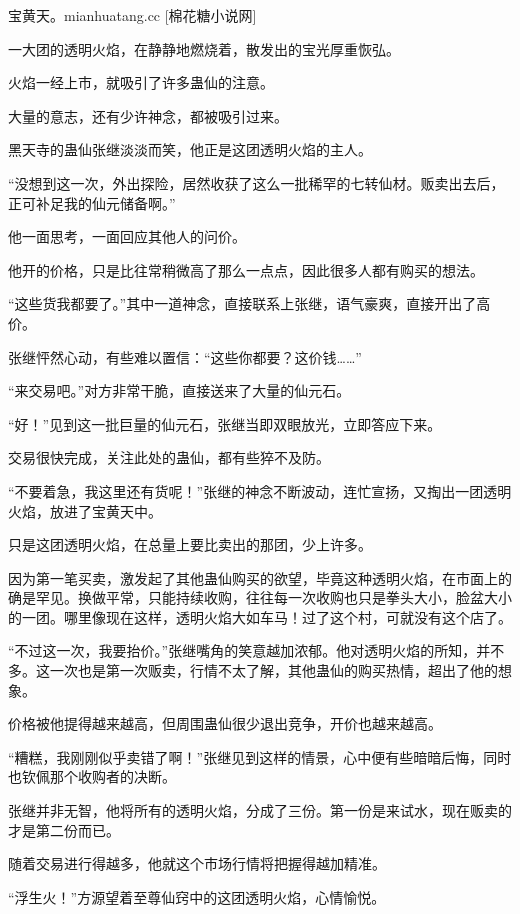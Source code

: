 
\begin{this_body}

宝黄天。mianhuatang.cc [棉花糖小说网]

一大团的透明火焰，在静静地燃烧着，散发出的宝光厚重恢弘。

火焰一经上市，就吸引了许多蛊仙的注意。

大量的意志，还有少许神念，都被吸引过来。

黑天寺的蛊仙张继淡淡而笑，他正是这团透明火焰的主人。

“没想到这一次，外出探险，居然收获了这么一批稀罕的七转仙材。贩卖出去后，正可补足我的仙元储备啊。”

他一面思考，一面回应其他人的问价。

他开的价格，只是比往常稍微高了那么一点点，因此很多人都有购买的想法。

“这些货我都要了。”其中一道神念，直接联系上张继，语气豪爽，直接开出了高价。

张继怦然心动，有些难以置信：“这些你都要？这价钱……”

“来交易吧。”对方非常干脆，直接送来了大量的仙元石。

“好！”见到这一批巨量的仙元石，张继当即双眼放光，立即答应下来。

交易很快完成，关注此处的蛊仙，都有些猝不及防。

“不要着急，我这里还有货呢！”张继的神念不断波动，连忙宣扬，又掏出一团透明火焰，放进了宝黄天中。

只是这团透明火焰，在总量上要比卖出的那团，少上许多。

因为第一笔买卖，激发起了其他蛊仙购买的欲望，毕竟这种透明火焰，在市面上的确是罕见。换做平常，只能持续收购，往往每一次收购也只是拳头大小，脸盆大小的一团。哪里像现在这样，透明火焰大如车马！过了这个村，可就没有这个店了。

“不过这一次，我要抬价。”张继嘴角的笑意越加浓郁。他对透明火焰的所知，并不多。这一次也是第一次贩卖，行情不太了解，其他蛊仙的购买热情，超出了他的想象。

价格被他提得越来越高，但周围蛊仙很少退出竞争，开价也越来越高。

“糟糕，我刚刚似乎卖错了啊！”张继见到这样的情景，心中便有些暗暗后悔，同时也钦佩那个收购者的决断。

张继并非无智，他将所有的透明火焰，分成了三份。第一份是来试水，现在贩卖的才是第二份而已。

随着交易进行得越多，他就这个市场行情将把握得越加精准。

“浮生火！”方源望着至尊仙窍中的这团透明火焰，心情愉悦。


\end{this_body}
